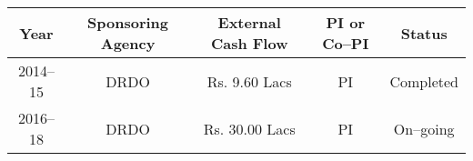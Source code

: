 \begin{center}{\small
		\begin{tabular}{||c|c|c|c|c||}
			\hline \hline
			Year & Sponsoring Agency & External Cash Flow & PI or Co--PI & Status\\
			\hline \hline
			2014--15 & DRDO & Rs. 9.60 Lacs & PI & Completed\\ \hline

			2016--18 & DRDO & Rs. 30.00 Lacs & PI & On--going \\ \hline\hline
	\end{tabular}}
\end{center}